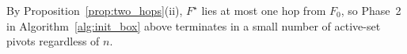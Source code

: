 \documentclass[pdflatex,sn-mathphys-num]{sn-jnl}%
\theoremstyle{thmstyleone}%
\theoremstyle{thmstyletwo}%
\theoremstyle{thmstylethree}%
\theoremstyle{thmstylethree}%
\begin{document}
\noindent
By Proposition~\ref{prop:two_hops}(ii), $F^\star$ lies at most one hop from $F_0$,
so Phase~2 in Algorithm~\ref{alg:init_box} above terminates in a small number of active-set pivots regardless of $n$.

%
%
\end{document}

